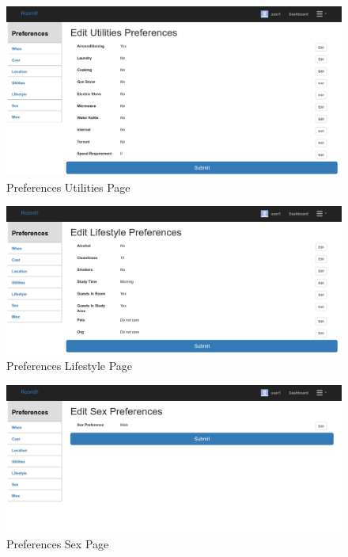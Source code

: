 \documentclass[journal]{IEEEtran}
\begin{document}
    \begin{figure}
        \centering
            \includegraphics[scale=0.17]{prefutilities.png}
            \caption{Preferences Utilities Page}
            \label{Preferences Utilities Page}
    \end{figure}
    \begin{figure}
        \centering
            \includegraphics[scale=0.17]{preflifestyle.png}
            \caption{Preferences Lifestyle Page}
            \label{Preferences Lifestyle Page}
    \end{figure}
    \begin{figure}
        \centering
            \includegraphics[scale=0.17]{prefsex.png}
            \caption{Preferences Sex Page}
            \label{Preferences Sex Page}
    \end{figure}
\end{document}
